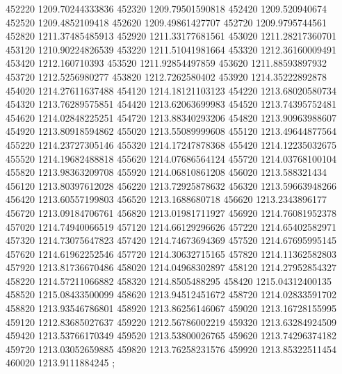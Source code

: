 {452220 1209.70244333836
452320 1209.79501590818
452420 1209.520940674
452520 1209.4852109418
452620 1209.49861427707
452720 1209.9795744561
452820 1211.37485485913
452920 1211.33177681561
453020 1211.28217360701
453120 1210.90224826539
453220 1211.51041981664
453320 1212.36160009491
453420 1212.160710393
453520 1211.92854497859
453620 1211.88593897932
453720 1212.5256980277
453820 1212.7262580402
453920 1214.35222892878
454020 1214.27611637488
454120 1214.18121103123
454220 1213.68020580734
454320 1213.76289575851
454420 1213.62063699983
454520 1213.74395752481
454620 1214.02848225251
454720 1213.88340293206
454820 1213.90963988607
454920 1213.80918594862
455020 1213.55089999608
455120 1213.49644877564
455220 1214.23727305146
455320 1214.17247878368
455420 1214.12235032675
455520 1214.19682488818
455620 1214.07686564124
455720 1214.03768100104
455820 1213.98363209708
455920 1214.06810861208
456020 1213.588321434
456120 1213.80397612028
456220 1213.72925878632
456320 1213.59663948266
456420 1213.60557199803
456520 1213.1688680718
456620 1213.2343896177
456720 1213.09184706761
456820 1213.01981711927
456920 1214.76081952378
457020 1214.74940066519
457120 1214.66129296626
457220 1214.65402582971
457320 1214.73075647823
457420 1214.74673694369
457520 1214.67695995145
457620 1214.61962252546
457720 1214.30632715165
457820 1214.11362582803
457920 1213.81736670486
458020 1214.04968302897
458120 1214.27952854327
458220 1214.57211066882
458320 1214.8505488295
458420 1215.04312400135
458520 1215.08433500099
458620 1213.94512451672
458720 1214.02833591702
458820 1213.93546786801
458920 1213.86256146067
459020 1213.16728155995
459120 1212.83685027637
459220 1212.56786002219
459320 1213.63284924509
459420 1213.53766170349
459520 1213.53800026765
459620 1213.74296374182
459720 1213.03052659885
459820 1213.76258231576
459920 1213.85322511454
460020 1213.9111884245
};

